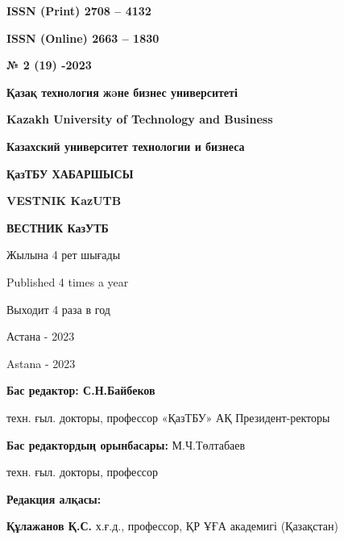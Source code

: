 \begin{flushright}
\textbf{ISSN (Print) 2708 -- 4132}

\textbf{ISSN (Online) 2663 -- 1830}

\vspace{1cm}

\textbf{№ 2 (19) -2023}
\end{flushright}

\vfill

\begin{center}
\textbf{\large Қазақ технология жəне бизнес университеті}

\vspace{0.3cm}

\textbf{\large Kazakh University of Technology and Business}

\vspace{0.3cm}

\textbf{\large Казахский университет технологии и бизнеса}

\vfill

\textbf{\huge ҚазТБУ ХАБАРШЫСЫ}

\vspace{0.5cm}

\textbf{\huge VESTNIK KazUTB}

\vspace{0.5cm}

\textbf{\huge ВЕСТНИК КазУТБ}

\vfill

Жылына 4 рет шығады

Published 4 times a year

Выходит 4 раза в год

\vfill

Астана - 2023

Astana - 2023
\end{center}

\pagebreak

\begin{center}
\textbf{Бас редактор: С.Н.Байбеков}

техн. ғыл. докторы, профессор «ҚазТБУ» АҚ Президент-ректоры

\textbf{Бас редактордың орынбасары:} М.Ч.Төлтабаев

техн. ғыл. докторы, профессор

\textbf{Редакция алқасы:}
\end{center}

\textbf{Құлажанов Қ.С.} х.ғ.д., профессор, ҚР ҰҒА академигі (Қазақстан)

